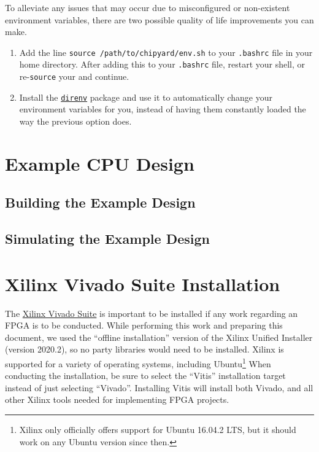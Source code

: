To alleviate any issues that may occur due to misconfigured or non-existent environment variables, there are two possible quality of life improvements you can make.
\begin{enumerate}
\item Add the line \texttt{source /path/to/chipyard/env.sh} to your \texttt{.bashrc} file in your home directory.
  After adding this to your \texttt{.bashrc} file, restart your shell, or re-\texttt{source} your  and continue.
\item Install the \href{https://direnv.net/}{\texttt{direnv}} package and use it to automatically change your environment variables for you, instead of having them constantly loaded the way the previous option does.
\end{enumerate}

\section{Example CPU Design}\label{sec:Example_CPU_Design}
\subsection{Building the Example Design}\label{sec:Building_Example_Design}

\subsection{Simulating the Example Design}\label{sec:Simulating_Example_Design}

\section{Xilinx Vivado Suite Installation}\label{sec:Xilinx_Vivado_Suide_Install}
The \href{https://www.xilinx.com/support/download.html}{Xilinx Vivado Suite} is important to be installed if any work regarding an FPGA is to be conducted.
While performing this work and preparing this document, we used the ``offline installation'' version of the Xilinx Unified Installer (version 2020.2), so no  party libraries would need to be installed.
Xilinx is supported for a variety of operating systems, including Ubuntu\footnote{Xilinx only officially offers support for Ubuntu 16.04.2 LTS, but it should work on any Ubuntu version since then.}
When conducting the installation, be sure to select the ``Vitis'' installation target instead of just selecting ``Vivado''.
Installing Vitis will install both Vivado, and all other Xilinx tools needed for implementing FPGA projects.


